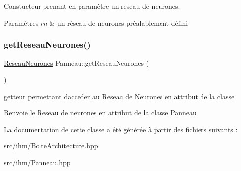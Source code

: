 Constucteur prenant en paramètre un reseau de neurones. 


\begin{DoxyParams}{Paramètres}
{\em rn} & un réseau de neurones préalablement défini \\
\hline
\end{DoxyParams}
\mbox{\label{classPanneau_a8ed7e5db0c0c8a0da729d3c785032643}} 
\subsubsection{\texorpdfstring{get\+Reseau\+Neurones()}{getReseauNeurones()}}
{\footnotesize\ttfamily \hyperlink{classReseauNeurones}{Reseau\+Neurones} Panneau\+::get\+Reseau\+Neurones (\begin{DoxyParamCaption}{ }\end{DoxyParamCaption})}



getteur permettant d\textquotesingle{}acceder au Reseau de Neurones en attribut de la classe 

\begin{DoxyReturn}{Renvoie}
le Reseau de neurones en attribut de la classe \hyperlink{classPanneau}{Panneau} 
\end{DoxyReturn}


La documentation de cette classe a été générée à partir des fichiers suivants \+:\begin{DoxyCompactItemize}
\item 
src/ihm/Boite\+Architecture.\+hpp\item 
src/ihm/Panneau.\+hpp\end{DoxyCompactItemize}
